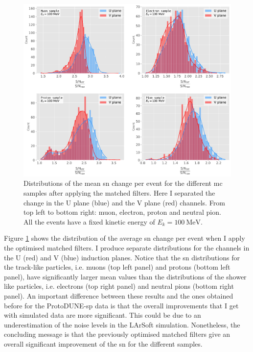 \begin{figure}[t]
	\centering
	\includegraphics[width=0.9\linewidth]{Images/Matched_Filter/larsoft_sn_hists.pdf}
	\caption[Distributions of the mean \gls{sn} change per event for the different \gls{mc} samples after applying the matched filters.]{Distributions of the mean \gls{sn} change per event for the different \gls{mc} samples after applying the matched filters. Here I separated the change in the U plane (blue) and the V plane (red) channels. From top left to bottom right: muon, electron, proton and neutral pion. All the events have a fixed kinetic energy of $E_{k} = 100 \ \mathrm{MeV}$.}
	\label{fig:mono_summary_hist}
\end{figure}

Figure \ref{fig:mono_summary_hist} shows the distribution of the average \gls{sn} change per event when I apply the optimised matched filters. I produce separate distributions for the channels in the U (red) and V (blue) induction planes. Notice that the \gls{sn} distributions for the track-like particles, i.e. muons (top left panel) and protons (bottom left panel), have significantly larger mean values than the distributions of the shower like particles, i.e. electrons (top right panel) and neutral pions (bottom right panel). An important difference between these results and the ones obtained before for the ProtoDUNE-\gls{sp} data is that the overall improvements that I get with simulated data are more significant. This could be due to an underestimation of the noise levels in the LArSoft simulation. Nonetheless, the concluding message is that the previously optimised matched filters give an overall significant improvement of the \gls{sn} for the different samples.

